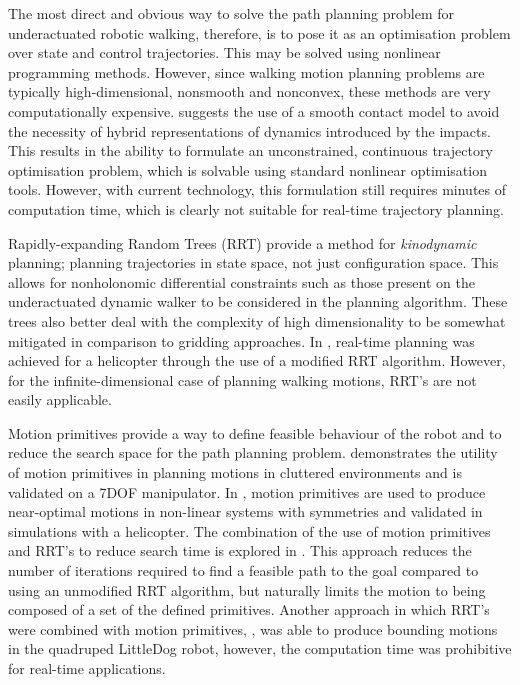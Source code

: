The most direct and obvious way to solve the path planning problem for underactuated robotic walking, therefore, is to pose it as an optimisation problem over state and control trajectories. This may be solved using nonlinear programming methods. However, since walking motion planning problems are typically high-dimensional, nonsmooth and nonconvex, these methods are very computationally expensive. \cite{tassa2012synthesis} suggests the use of a smooth contact model to avoid the necessity of hybrid representations of dynamics introduced by the impacts. This results in the ability to formulate an unconstrained, continuous trajectory optimisation problem, which is solvable using standard nonlinear optimisation tools. However, with current technology, this formulation still requires minutes of computation time, which is clearly not suitable for real-time trajectory planning. 

Rapidly-expanding Random Trees (RRT) \cite{lavalle2001randomized} provide a method for \textit{kinodynamic} planning; planning trajectories in state space, not just configuration space. This allows for nonholonomic differential constraints such as those present on the underactuated dynamic walker to be considered in the planning algorithm. These trees also better deal with the complexity of high dimensionality to be somewhat mitigated in comparison to gridding approaches. In \cite{frazzoli2002real}, real-time planning was achieved for a helicopter through the use of a modified RRT algorithm. However, for the infinite-dimensional case of planning walking motions, RRT's are not easily applicable. %

Motion primitives provide a way to define feasible behaviour of the robot and to reduce the search space for the path planning problem. \cite{cohen2011planning} demonstrates the utility of motion primitives in planning motions in cluttered environments and is validated on a 7DOF manipulator. In \cite{frazzoli2005maneuver}, motion primitives are used to produce near-optimal motions in non-linear systems with symmetries and validated in simulations with a helicopter. The combination of the use of motion primitives and RRT's to reduce search time is explored in \cite{vonasek2013global}. This approach reduces the number of iterations required to find a feasible path to the goal compared to using an unmodified RRT algorithm, but naturally limits the motion to being composed of a set of the defined primitives. Another approach in which RRT's were combined with motion primitives, \cite{shkolnik2011bounding}, was able to produce bounding motions in the quadruped LittleDog robot, however, the computation time was prohibitive for real-time applications. 


